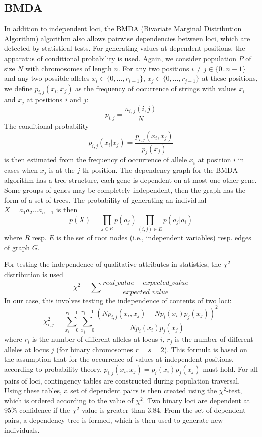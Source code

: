 \subsection{BMDA}\label{algorithmBMDA}
In addition to independent loci, the BMDA (Bivariate Marginal Distribution
Algorithm) algorithm also allows pairwise dependencies between loci, which are detected
by statistical tests. For generating values at dependent positions, the apparatus
of conditional probability is used.
Again, we consider population $P$ of size $N$ with chromosomes of length $n$. For any two
positions $i \neq j \in \{0..n-1\}$ and any two possible alleles $x_i \in \{0,\dots,r_{i-1}\}$,
$x_j \in \{0,\dots,r_{j-1}\}$ at
these positions, we define $p_{i,j}(x_i,x_j)$ as the frequency of occurrence of strings with values $x_i$
and $x_j$ at positions $i$ and $j$:
\begin{equation}
  p_{i,j} = \frac{n_{i,j}(i,j)}{N}
\end{equation}
The conditional probability
\begin{equation}
  p_{i,j}(x_i | x_j) = \frac{p_{i,j}(x_i, x_j)}{p_j(x_j)}
\end{equation}
is then estimated from the frequency of occurrence of allele $x_i$ at position $i$ in cases when $x_j$ is
at the $j$-th position.
The dependency graph \cite{evo, pelikan} for the BMDA algorithm has a tree structure, each gene is
dependent on at most one other gene. Some groups of genes may be
completely independent, then the graph has the form of a set of trees.
The probability of generating an individual $X = a_1 a_2 \dots a_{n-1}$ is then
\begin{equation}
p(X) = \prod\limits_{j \in R} p(a_j) \prod\limits_{(i,j) \in E} p(a_j|a_i)
\end{equation}
where $R$ resp. $E$ is the set of root nodes (i.e., independent variables) resp. edges of graph $G$.

For testing the independence of qualitative attributes in statistics, the $\chi^2$ distribution is used
\begin{equation}
  \chi^2 = \sum\frac{real\_value - expected\_value}{expected\_value}
\end{equation}
In our case, this involves testing the independence of contents of two loci:
\begin{equation}
  \chi^2_{i,j} = \sum\limits_{x_i = 0}^{r_i -1} \sum\limits_{x_j = 0}^{r_j -1}
  \frac{(Np_{i,j}(x_i, x_j) - Np_i(x_i)p_j(x_j))^2}{Np_i(x_i)p_j(x_j)}
\end{equation}
where $r_i$ is the number of different alleles at locus $i$, $r_j$ is the number of different alleles at locus $j$ (for
binary chromosomes $r = s = 2$). This formula is based on the assumption that for
the occurrence of values at independent positions, according to probability theory,
$p_{i, j} (x_i , x_j) = p_i(x_i) p_j(x_j)$ must hold.
For all pairs of loci, contingency tables are constructed during population traversal.
Using these tables, a set of dependent pairs is then created using the $\chi^2$-test, which
is ordered according to the value of $\chi^2$.
Two binary loci are dependent at 95\% confidence if the $\chi^2$ value is greater than 3.84.
From the set of dependent pairs, a dependency tree is formed, which is then used to generate
new individuals.


